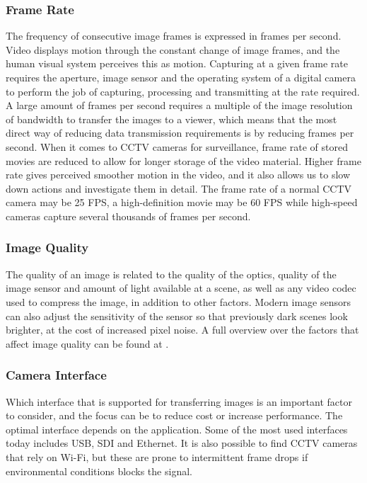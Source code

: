 \subsubsection{Frame Rate}
The frequency of consecutive image frames is expressed in frames per second. Video displays motion through the constant change of image frames, and the human visual system perceives this as motion.
Capturing at a given frame rate requires the aperture, image sensor and the operating system of a digital camera to perform the job of capturing, processing and transmitting at the rate required.
A large amount of frames per second requires a multiple of the image resolution of bandwidth to transfer the images to a viewer, which means that the most direct way of reducing data transmission requirements is by reducing frames per second. When it comes to CCTV cameras for surveillance, frame rate of stored movies are reduced to allow for longer storage of the video material.
Higher frame rate gives perceived smoother motion in the video, and it also allows us to slow down actions and investigate them in detail.
The frame rate of a normal CCTV camera may be 25 FPS, a high-definition movie may be 60 FPS while high-speed cameras capture several thousands of frames per second.

\subsubsection{Image Quality}
The quality of an image is related to the quality of the optics, quality of the image sensor and amount of light available at a scene, as well as any video codec used to compress the image, in addition to other factors.
Modern image sensors can also adjust the sensitivity of the sensor so that previously dark scenes look brighter, at the cost of increased pixel noise.
A full overview over the factors that affect image quality can be found at \citep{imatest15}.

\subsubsection{Camera Interface}
Which interface that is supported for transferring images is an important factor to consider, and the focus can be to reduce cost or increase performance. The optimal interface depends on the application.
Some of the most used interfaces today includes USB, SDI and Ethernet. It is also possible to find CCTV cameras that rely on Wi-Fi, but these are prone to intermittent frame drops if environmental conditions blocks the signal.

